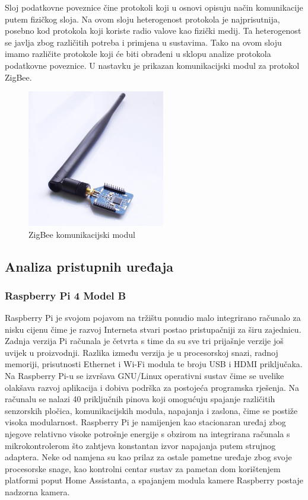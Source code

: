 \documentclass[times, utf8, diplomski]{fer}
\begin{document}
Sloj podatkovne poveznice čine protokoli koji u osnovi opisuju način komunikacije putem fizičkog sloja. Na ovom sloju heterogenost protokola je najprisutnija, posebno kod protokola koji koriste radio valove kao fizički medij. Ta heterogenost se javlja zbog različitih potreba i primjena u sustavima. Tako na ovom sloju imamo različite protokole koji će biti obrađeni u sklopu analize protokola podatkovne poveznice. U nastavku je prikazan komunikacijski modul za protokol ZigBee.
\begin{figure}[htb]
    \centering
    \includegraphics[width=6cm]{images/zigbee-module.jpg}
    \caption{ZigBee komunikacijski modul\citep{ZigBeemodule}}
    \label{fig:zigbeemodule}
\end{figure}

\subsection{Analiza pristupnih uređaja}
\subsubsection{Raspberry Pi 4 Model B}
Raspberry Pi je svojom pojavom na tržištu ponudio malo integrirano računalo za nisku cijenu čime je razvoj Interneta stvari postao pristupačniji za širu zajednicu. Zadnja verzija Pi računala je četvrta s time da su sve tri prijašnje verzije još uvijek u proizvodnji. Razlika između verzija je u procesorskoj snazi, radnoj memoriji, prisutnosti Ethernet i Wi-Fi modula te broju USB i HDMI priključaka. Na Raspberry Pi-u se izvršava GNU/Linux operativni sustav čime se uvelike olakšava razvoj aplikacija i dobiva podrška za postojeća programska rješenja. Na računalu se nalazi 40 priključnih pinova koji omogućuju spajanje različitih senzorskih pločica, komunikacijskih modula, napajanja i zaslona, čime se postiže visoka modularnost. Raspberry Pi je namijenjen kao stacionaran uređaj zbog njegove relativno visoke potrošnje energije s obzirom na integrirana računala s mikrokontrolerom što zahtjeva konstantan izvor napajanja putem strujnog adaptera. Neke od namjena su kao prilaz za ostale pametne uređaje zbog svoje procesorske snage, kao kontrolni centar sustav za pametan dom korištenjem platformi poput Home Assistanta, a spajanjem modula kamere Raspberry postaje nadzorna kamera. 
\end{document}
